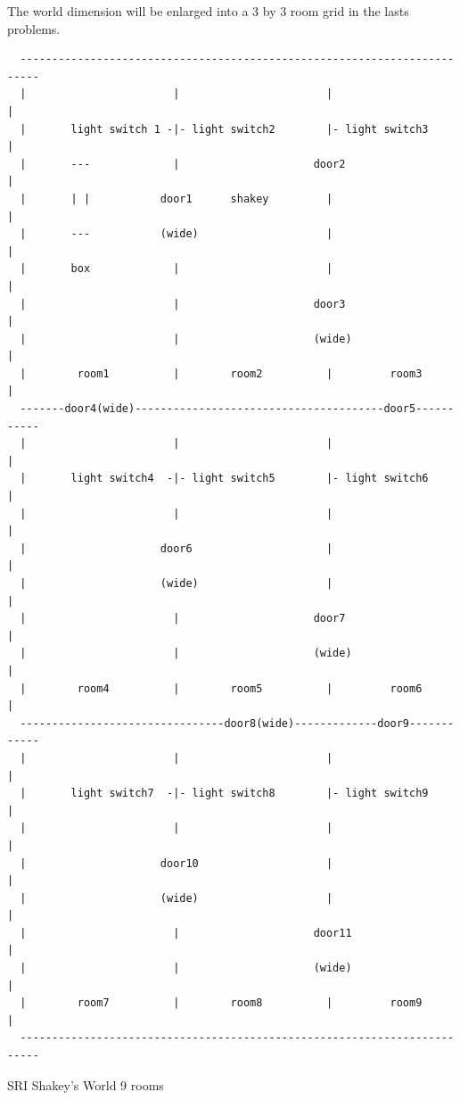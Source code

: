 \newpage
The world dimension will be enlarged into a 3 by 3 room grid in the lasts
problems.
\thispagestyle{empty}
\begin{center}
  \begin{verbatim}
  -------------------------------------------------------------------------
  |                       |                       |                       |
  |       light switch 1 -|- light switch2        |- light switch3        |
  |       ---             |                     door2                     |
  |       | |           door1      shakey         |                       |
  |       ---           (wide)                    |                       |
  |       box             |                       |                       |
  |                       |                     door3                     |
  |                       |                     (wide)                    |
  |        room1          |        room2          |         room3         |
  -------door4(wide)---------------------------------------door5-----------
  |                       |                       |                       |
  |       light switch4  -|- light switch5        |- light switch6        |
  |                       |                       |                       |
  |                     door6                     |                       |
  |                     (wide)                    |                       |
  |                       |                     door7                     |
  |                       |                     (wide)                    |
  |        room4          |        room5          |         room6         |
  --------------------------------door8(wide)-------------door9------------
  |                       |                       |                       |
  |       light switch7  -|- light switch8        |- light switch9        |
  |                       |                       |                       |
  |                     door10                    |                       |
  |                     (wide)                    |                       |
  |                       |                     door11                    |
  |                       |                     (wide)                    |
  |        room7          |        room8          |         room9         |
  -------------------------------------------------------------------------
  \end{verbatim}
  SRI Shakey's World 9 rooms
\end{center}

